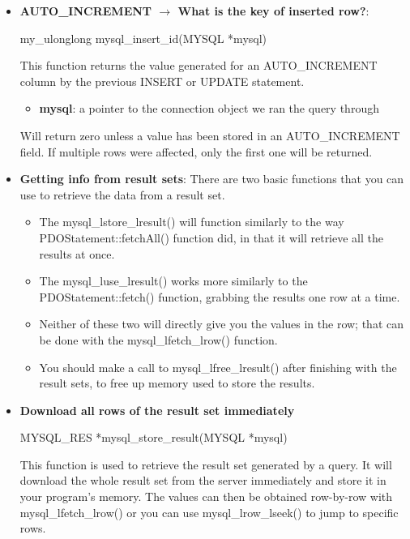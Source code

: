 \documentclass{report}
\begin{document}
\begin{itemize}
\begin{itemize}
            \end{itemize}
        \item \textbf{AUTO\_INCREMENT $\to$ What is the key of inserted row?}:
            \bigbreak \noindent 
            \begin{cppcode}
                my_ulonglong mysql_insert_id(MYSQL *mysql)
            \end{cppcode}
            \bigbreak \noindent 
            This function returns the value generated for an AUTO\_INCREMENT column by the previous INSERT or UPDATE statement.
            \begin{itemize}
                \item \textbf{mysql}: a pointer to the connection object we ran the query through
            \end{itemize}
            \bigbreak \noindent 
            Will return zero unless a value has been stored in an AUTO\_INCREMENT field. If multiple rows were affected, only the first one will be returned.
        \item \textbf{Getting info from result sets}: There are two basic functions that you can use to retrieve the data from a result set.
            \begin{itemize}
                \item The mysql\_lstore\_lresult() will function similarly to the way PDOStatement::fetchAll() function did, in that it will retrieve all the results at once.
                \item The mysql\_luse\_lresult() works more similarly to the PDOStatement::fetch() function, grabbing the results one row at a time.
                \item Neither of these two will directly give you the values in the row; that can be done with the mysql\_lfetch\_lrow() function.
                \item You should make a call to mysql\_lfree\_lresult() after finishing with the result sets, to free up memory used to store the results.
            \end{itemize}
        \item \textbf{Download all rows of the result set immediately}
            \bigbreak \noindent 
            \begin{cppcode}
                MYSQL_RES *mysql_store_result(MYSQL *mysql)
            \end{cppcode}
            \bigbreak \noindent 
            This function is used to retrieve the result set generated by a query. It will download the whole result set from the server immediately and store it in your program’s memory. The values can then be obtained row-by-row with mysql\_lfetch\_lrow() or you can use mysql\_lrow\_lseek() to jump to specific rows.

\end{itemize}
\end{document}
